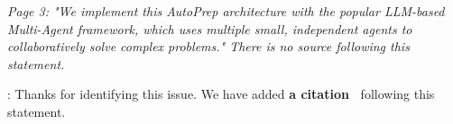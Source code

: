 %
%
%
%


\begin{shaded}
{
\emph{Page 3: "We implement this AutoPrep architecture with the popular LLM-based Multi-Agent framework, which uses multiple small, independent agents to collaboratively solve complex problems." There is no source following this statement.}
}
\end{shaded}

: Thanks for identifying this issue. 
We have added \textbf{a citation~\cite{han2024llm}} following this statement.


